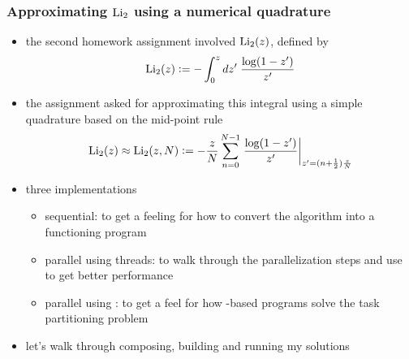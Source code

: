 %
%
%
%


\begin{frame}[fragile]
%
  \frametitle{Approximating $\mbox{\rm Li}_{2}$ using a numerical quadrature}
%
  \begin{itemize}
%
  \item the second homework assignment involved $\mbox{\rm Li}_{2}(z)$, defined by
    \begin{equation*}
      \mbox{\rm Li}_{2}(z) \mathrel{\mathop:}= - \int_{0}^{z} dz' \; \frac{\log(1-z')}{z'}
    \end{equation*}
%
    \item the assignment asked for approximating this integral using a simple
      quadrature based on the mid-point rule
      \begin{equation*}
      \mbox{\rm Li}_{2}(z) 
      \approx 
      \mbox{\rm Li}_{2}(z, N) 
      \mathrel{\mathop:}=
      - \frac{z}{N} \sum_{n=0}^{N-1} \left.
        \frac{\log(1-z')}{z'}
      \right|_{z'=(n+\frac{1}{2})\frac{z}{N}}
    \end{equation*}
%
    \item three implementations
      \begin{itemize}
      \item sequential: to get a feeling for how to convert the algorithm into a functioning
        program
      \item parallel using threads: to walk through the parallelization steps and use
         to get better performance
      \item parallel using \mpi: to get a feel for how \mpi-based programs solve the task
        partitioning problem
      \end{itemize}
%
    \item let's walk through composing, building and running my solutions
%
  \end{itemize}
%
\end{frame}

